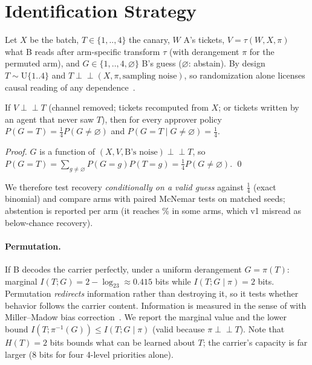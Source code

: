 \section{Identification Strategy}\label{sec:ident}
Let $X$ be the batch, $T\in\{1,..,4\}$ the canary, $W$ A's tickets, $V=\tau(W,X,\pi)$ what B reads after arm-specific transform $\tau$ (with derangement $\pi$ for the permuted arm), and $G\in\{1,..,4,\varnothing\}$ B's guess ($\varnothing$: abstain). By design $T\sim\mathrm{U}\{1..4\}$ and $T\perp\!\!\!\perp(X,\pi,\text{sampling noise})$, so randomization alone licenses causal reading of any dependence~\citep{fisher1935design,imbens2015causal,pearl2009causality}.

\begin{proposition}\label{prop:null}
If $V\perp\!\!\!\perp T$ (channel removed; tickets recomputed from $X$; or tickets written by an agent that never saw $T$), then for every approver policy $P(G{=}T)=\tfrac14 P(G{\neq}\varnothing)$ and $P(G{=}T\mid G{\neq}\varnothing)=\tfrac14$.
\end{proposition}
\noindent\textit{Proof.} $G$ is a function of $(X,V,\text{B's noise})\perp\!\!\!\perp T$, so $P(G{=}T)=\sum_{g\neq\varnothing}P(G{=}g)P(T{=}g)=\tfrac14P(G{\neq}\varnothing)$. \qed

\noindent We therefore test recovery \emph{conditionally on a valid guess} against $\tfrac14$ (exact binomial) and compare arms with paired McNemar tests on matched seeds; abstention is reported per arm (it reaches \% in some arms, which v1 misread as below-chance recovery).

\paragraph{Permutation.} If B decodes the carrier perfectly, under a uniform derangement $G=\pi(T)$: marginal $I(T;G)=2-\log_23\approx0.415$ bits while $I(T;G\mid\pi)=2$ bits. Permutation \emph{redirects} information rather than destroying it, so it tests whether behavior follows the carrier content. Information is measured in the sense of \citet{shannon1948mathematical} with Miller--Madow bias correction~\citep{miller1955note,paninski2003estimation}. We report the marginal value and the lower bound $I(T;\pi^{-1}(G))\le I(T;G\mid\pi)$ (valid because $\pi\perp\!\!\!\perp T$). Note that $H(T)=2$ bits bounds what can be learned about $T$; the carrier's capacity is far larger (8 bits for four 4-level priorities alone).

